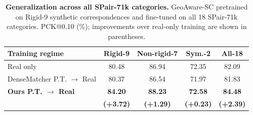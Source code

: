\begin{table}[h!]
    \centering
    \captionsetup{justification=centering}
    \small
    \setlength{\tabcolsep}{3pt}
    \renewcommand{\arraystretch}{0.95}

    \caption{
        \textbf{Generalization across all SPair-71k categories.}
        GeoAware-SC pretrained on Rigid-9 synthetic correspondences
        and fine-tuned on all 18 SPair-71k categories.
        PCK@0.10 (\%); improvements over real-only
        training are shown in parentheses.
    }
    \label{tab:spair_all18}

    \vspace{4pt}

    \centering
    \begin{tabular}{lcccc}
        \toprule
        \textbf{Training regime} &
        Rigid-9 &
        Non-rigid-7 &
        Sym.-2 &
        All-18 \\
        \midrule

        Real only
        & 80.48 & 86.94 & 72.35 & 82.09 \\

        DenseMatcher \cite{zhu2025densematcher} P.T. $\rightarrow$ Real
        & 80.37 & 86.54 & 71.97 & 81.83 \\

        \textbf{Ours P.T. $\rightarrow$ Real}
        & \textbf{84.20} & \textbf{88.23}
        & \textbf{72.58} & \textbf{84.48} \\
        & \textbf{(+3.72)} & \textbf{(+1.29)}
        & \textbf{(+0.23)} & \textbf{(+2.39)} \\

        \bottomrule
    \end{tabular}
\end{table}